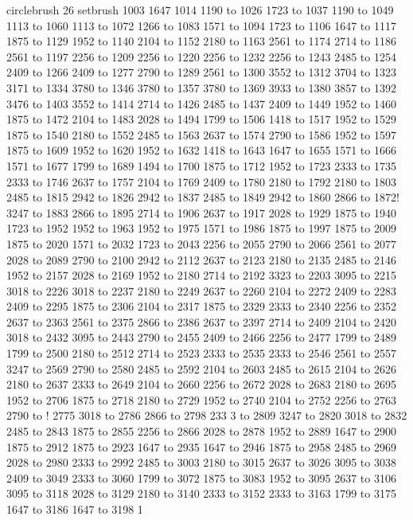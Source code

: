 circlebrush 26 setbrush
1003 1647 1014 1190 to 1026 1723 to 1037 1190 to 1049 1113 to 1060 1113 to 1072 1266 to 1083 1571 to 1094 1723 to 1106 1647 to 1117 1875 to 1129 1952 to 1140 2104 to 1152 2180 to 1163 2561 to 1174 2714 to 1186 2561 to 1197 2256 to 1209 2256 to 1220 2256 to 1232 2256 to 1243 2485 to 1254 2409 to 1266 2409 to 1277 2790 to 1289 2561 to 1300 3552 to 1312 3704 to 1323 3171 to 1334 3780 to 1346 3780 to 1357 3780 to 1369 3933 to 1380 3857 to 1392 3476 to 1403 3552 to 1414 2714 to 1426 2485 to 1437 2409 to 1449 1952 to 1460 1875 to 1472 2104 to 1483 2028 to 1494 1799 to 1506 1418 to 1517 1952 to 1529 1875 to 1540 2180 to 1552 2485 to 1563 2637 to 1574 2790 to 1586 1952 to 1597 1875 to 1609 1952 to 1620 1952 to 1632 1418 to 1643 1647 to 1655 1571 to 1666 1571 to 1677 1799 to 1689 1494 to 1700 1875 to 1712 1952 to 1723 2333 to 1735 2333 to 1746 2637 to 1757 2104 to 1769 2409 to 1780 2180 to 1792 2180 to 1803 2485 to 1815 2942 to 1826 2942 to 1837 2485 to 1849 2942 to 1860 2866 to 1872!
 3247 to 1883 2866 to 1895 2714 to
 1906 2637 to 1917 2028 to 1929 1875 to 1940 1723 to 1952 1952 to 1963 1952 to 1975 1571 to 1986 1875 to 1997 1875 to 2009 1875 to 2020 1571 to 2032 1723 to 2043 2256 to 2055 2790 to 2066 2561 to 2077 2028 to 2089 2790 to 2100 2942 to 2112 2637 to 2123 2180 to 2135 2485 to 2146 1952 to 2157 2028 to 2169 1952 to 2180 2714 to 2192 3323 to 2203 3095 to 2215 3018 to 2226 3018 to 2237 2180 to 2249 2637 to 2260 2104 to 2272 2409 to 2283 2409 to 2295 1875 to 2306 2104 to 2317 1875 to 2329 2333 to 2340 2256 to 2352 2637 to 2363 2561 to 2375 2866 to 2386 2637 to 2397 2714 to 2409 2104 to 2420 3018 to 2432 3095 to 2443 2790 to 2455 2409 to 2466 2256 to 2477 1799 to 2489 1799 to 2500 2180 to 2512 2714 to 2523 2333 to 2535 2333 to 2546 2561 to 2557 3247 to 2569 2790 to 2580 2485 to 2592 2104 to 2603 2485 to 2615 2104 to 2626 2180 to 2637 2333 to 2649 2104 to 2660 2256 to 2672 2028 to 2683 2180 to 2695 1952 to 2706 1875 to 2718 2180 to 2729 1952 to 2740 2104 to 2752 2256 to 2763 2790 to !
2775 3018 to 2786 2866 to 2798 233
3 to 2809 3247 to 2820 3018 to 2832 2485 to 2843 1875 to 2855 2256 to 2866 2028 to 2878 1952 to 2889 1647 to 2900 1875 to 2912 1875 to 2923 1647 to 2935 1647 to 2946 1875 to 2958 2485 to 2969 2028 to 2980 2333 to 2992 2485 to 3003 2180 to 3015 2637 to 3026 3095 to 3038 2409 to 3049 2333 to 3060 1799 to 3072 1875 to 3083 1952 to 3095 2637 to 3106 3095 to 3118 2028 to 3129 2180 to 3140 2333 to 3152 2333 to 3163 1799 to 3175 1647 to 3186 1647 to 3198 1
